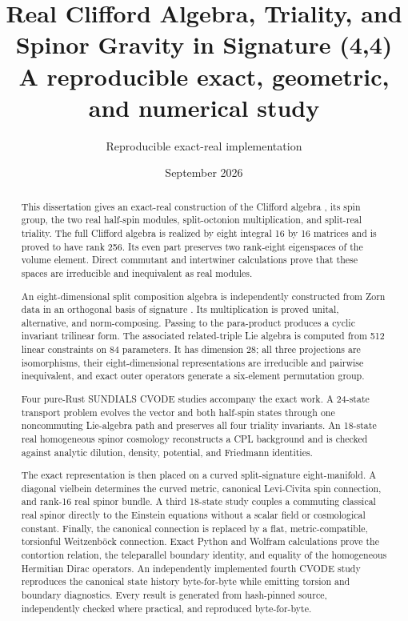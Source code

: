 \documentclass[11pt]{article}
\title{Real Clifford Algebra, Triality, and Spinor Gravity in Signature (4,4)\\[0.5em]\large A reproducible exact, geometric, and numerical study}
\author{Reproducible exact-real implementation}
\date{September 2026}
\begin{document}
\maketitle
\tableofcontents
\newpage
\begin{abstract}
This dissertation gives an exact-real construction of the Clifford algebra \texttt{}, its spin group, the two real half-spin modules, split-octonion multiplication, and split-real triality. The full Clifford algebra is realized by eight integral 16 by 16 matrices and is proved to have rank 256. Its even part preserves two rank-eight eigenspaces of the volume element. Direct commutant and intertwiner calculations prove that these spaces are irreducible and inequivalent as real \texttt{} modules.

An eight-dimensional split composition algebra is independently constructed from Zorn data in an orthogonal basis of signature \texttt{}. Its multiplication is proved unital, alternative, and norm-composing. Passing to the para-product produces a cyclic invariant trilinear form. The associated related-triple Lie algebra is computed from 512 linear constraints on 84 parameters. It has dimension 28; all three projections are isomorphisms, their eight-dimensional representations are irreducible and pairwise inequivalent, and exact outer operators generate a six-element permutation group.

Four pure-Rust SUNDIALS CVODE studies accompany the exact work. A 24-state transport problem evolves the vector and both half-spin states through one noncommuting Lie-algebra path and preserves all four triality invariants. An 18-state real homogeneous spinor cosmology reconstructs a CPL background and is checked against analytic dilution, density, potential, and Friedmann identities.

The exact representation is then placed on a curved split-signature eight-manifold. A diagonal vielbein determines the curved metric, canonical Levi-Civita spin connection, and rank-16 real spinor bundle. A third 18-state study couples a commuting classical real spinor directly to the Einstein equations without a scalar field or cosmological constant. Finally, the canonical connection is replaced by a flat, metric-compatible, torsionful Weitzenböck connection. Exact Python and Wolfram calculations prove the contortion relation, the teleparallel boundary identity, and equality of the homogeneous Hermitian Dirac operators. An independently implemented fourth CVODE study reproduces the canonical state history byte-for-byte while emitting torsion and boundary diagnostics. Every result is generated from hash-pinned source, independently checked where practical, and reproduced byte-for-byte.

\end{abstract}
\end{document}
